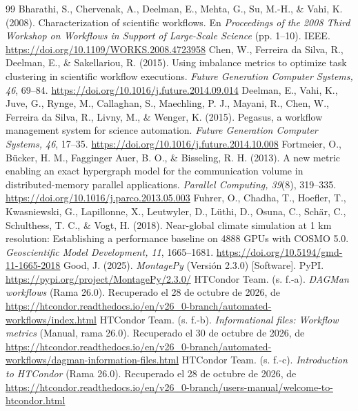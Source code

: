 \begin{thebibliography}{99}
 Bharathi, S., Chervenak, A., Deelman, E., Mehta, G., Su, M.-H., \& Vahi, K. (2008). Characterization of scientific workflows. En \emph{Proceedings of the 2008 Third Workshop on Workflows in Support of Large-Scale Science} (pp. 1--10). IEEE. \url{https://doi.org/10.1109/WORKS.2008.4723958}
 Chen, W., Ferreira da Silva, R., Deelman, E., \& Sakellariou, R. (2015). Using imbalance metrics to optimize task clustering in scientific workflow executions. \emph{Future Generation Computer Systems, 46}, 69--84. \url{https://doi.org/10.1016/j.future.2014.09.014}
 Deelman, E., Vahi, K., Juve, G., Rynge, M., Callaghan, S., Maechling, P. J., Mayani, R., Chen, W., Ferreira da Silva, R., Livny, M., \& Wenger, K. (2015). Pegasus, a workflow management system for science automation. \emph{Future Generation Computer Systems, 46}, 17--35. \url{https://doi.org/10.1016/j.future.2014.10.008}
 Fortmeier, O., Bücker, H. M., Fagginger Auer, B. O., \& Bisseling, R. H. (2013). A new metric enabling an exact hypergraph model for the communication volume in distributed-memory parallel applications. \emph{Parallel Computing, 39}(8), 319--335. \url{https://doi.org/10.1016/j.parco.2013.05.003}
 Fuhrer, O., Chadha, T., Hoefler, T., Kwasniewski, G., Lapillonne, X., Leutwyler, D., Lüthi, D., Osuna, C., Schär, C., Schulthess, T. C., \& Vogt, H. (2018). Near-global climate simulation at 1 km resolution: Establishing a performance baseline on 4888 GPUs with COSMO 5.0. \emph{Geoscientific Model Development, 11}, 1665--1681. \url{https://doi.org/10.5194/gmd-11-1665-2018}
 Good, J. (2025). \emph{MontagePy} (Versión 2.3.0) [Software]. PyPI. \url{https://pypi.org/project/MontagePy/2.3.0/}
 HTCondor Team. (s. f.-a). \emph{DAGMan workflows} (Rama 26.0). Recuperado el 28 de octubre de 2026, de \url{https://htcondor.readthedocs.io/en/v26_0-branch/automated-workflows/index.html}
 HTCondor Team. (s. f.-b). \emph{Informational files: Workflow metrics} (Manual, rama 26.0). Recuperado el 30 de octubre de 2026, de \url{https://htcondor.readthedocs.io/en/v26_0-branch/automated-workflows/dagman-information-files.html}
 HTCondor Team. (s. f.-c). \emph{Introduction to HTCondor} (Rama 26.0). Recuperado el 28 de octubre de 2026, de \url{https://htcondor.readthedocs.io/en/v26_0-branch/users-manual/welcome-to-htcondor.html}

\end{thebibliography}
